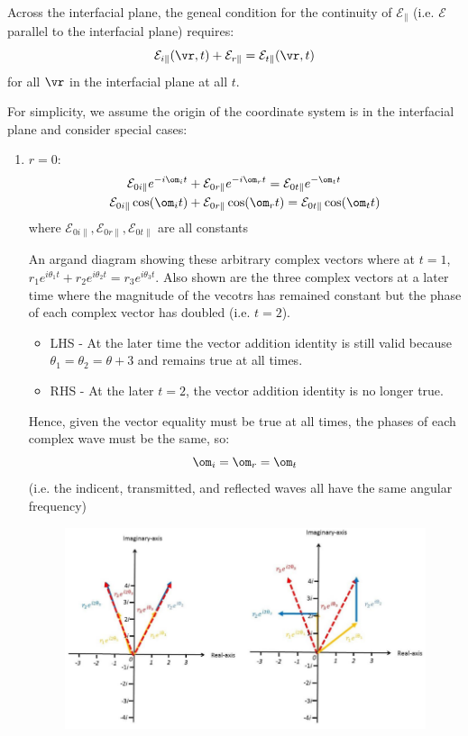 \documentclass[a4paper, 11pt, normalem]{report}
\renewcommand\E{\mathcal{E}}
\begin{document}
Across the interfacial plane, the geneal condition for the continuity of $\E_{\parallel}$ (i.e. $\E$ parallel to the interfacial plane) requires:
\begin{equation}
	\E_{i\parallel} (\vr,t) + \E_{r\parallel} = \E_{t\parallel}(\vr,t)
\end{equation}
for all $\vr$ in the interfacial plane at all $t$.

For simplicity, we assume the origin of the coordinate system is in the interfacial plane and consider special cases:
\begin{enumerate}
	\item $r=0$:
	\begin{align}
		\E_{0i\parallel}e^{-i\om_it} &+ \E_{0r\parallel}e^{-i\om_rt} = \E_{0t\parallel}e^{-\om_tt} \\
		\E_{0i\parallel}\cos(\om_it) &+ \E_{0r\parallel}\cos(\om_rt) = \E_{0t\parallel}\cos(\om_tt)
	\end{align}
	where $\E_{0i\parallel},\E_{0r\parallel},\E_{0t\parallel}$ are all constants

	An argand diagram showing these arbitrary complex vectors where at $t=1$, $r_1e^{i\theta_1t} + r_2e^{i\theta_2t} = r_3e^{i\theta_3t}$.
	Also shown are the three complex vectors at a later time where the magnitude of the vecotrs has remained constant but the phase of each complex vector has doubled (i.e. $t=2$).
	\begin{itemize}
		\item LHS - At the later time the vector addition identity is still valid because $\theta_1 = \theta_2 = \theta+3$ and remains true at all times.
		\item RHS - At the later $t=2$, the vector addition identity is no longer true.
	\end{itemize}
	Hence, given the vector equality must be true at all times, the phases of each complex wave must be the same, so:
	\begin{equation}
		\om_i = \om_r = \om_t
	\end{equation}
	(i.e. the indicent, transmitted, and reflected waves all have the same angular frequency)

	\begin{figure}[H]
		\centering
		\includegraphics[scale=0.4]{argand.png}
	\end{figure}


\end{enumerate}
\end{document}
